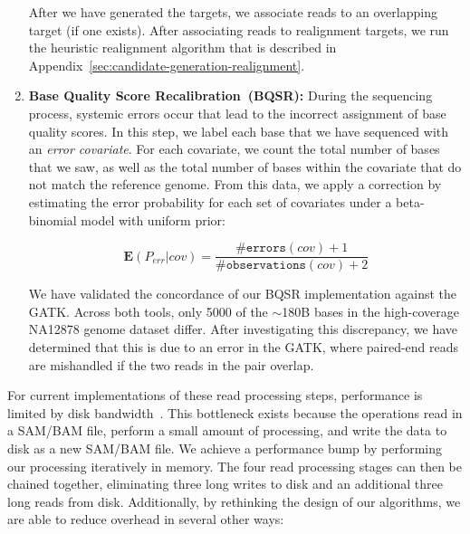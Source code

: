 \documentclass{acm_proc_article-sp}
\begin{document}
\begin{enumerate}
After we have generated the targets, we associate reads to an overlapping target (if one exists). After
associating reads to realignment targets, we run the heuristic realignment algorithm that is described
in Appendix~\ref{sec:candidate-generation-realignment}.
\item \textbf{Base Quality Score Recalibration~(BQSR):} During the sequencing process, systemic errors occur
that lead to the incorrect assignment of base quality scores. In this step, we label each base that we have
sequenced with an \emph{error covariate}. For each covariate, we count the total number of bases that we saw,
as well as the total number of bases within the covariate that do not match the reference genome. From this data, 
we apply a correction by estimating the error probability for each set of covariates under a beta-binomial model
with uniform prior:

\begin{equation}
\label{eqn:bqsrerr}
\mathbf{E}(P_{err}|{cov}) = \frac{\texttt{\#errors}(cov) + 1}{\texttt{\#observations}(cov) + 2}
\end{equation}

We have validated the concordance of our BQSR implementation against the GATK. Across both tools, only 5000
of the $\sim$180B bases in the high-coverage NA12878 genome dataset differ. After investigating this
discrepancy, we have determined that this is due to an error in the GATK, where paired-end reads are
mishandled if the two reads in the pair overlap.
\end{enumerate}

For current implementations of these read processing steps, performance is limited by disk
bandwidth~\cite{diao15}. This bottleneck exists because the operations read in a SAM/BAM file, perform
a small amount of processing, and write the data to disk as a new SAM/BAM file. We achieve a
performance bump by performing our processing iteratively in memory. The four read processing stages
can then be chained together, eliminating three long writes to disk and an additional three long reads
from disk. Additionally, by rethinking the design of our algorithms, we are able to reduce overhead in
several other ways:
\end{document}
